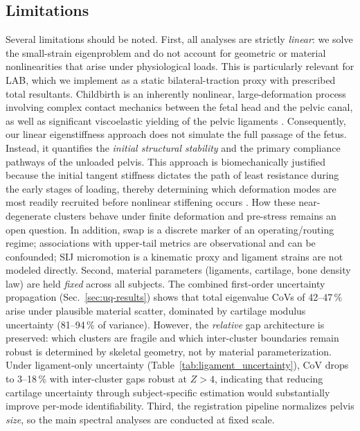 \documentclass[11pt]{article}
\begin{document}
\subsection*{Limitations}
Several limitations should be noted.
First, all analyses are strictly \emph{linear}: we solve the small-strain eigenproblem and do not account for geometric or material nonlinearities that arise under physiological loads.
This is particularly relevant for LAB, which we implement as a static bilateral-traction proxy with prescribed total resultants. 
Childbirth is an inherently nonlinear, large-deformation process involving complex contact mechanics between the fetal head and the pelvic canal, as well as significant viscoelastic yielding of the pelvic ligaments \citep{BiomechPregnancy2022,ChenGrimm2021,Almeida2024Uterus,Vleeming2012}. 
Consequently, our linear eigenstiffness approach does not simulate the full passage of the fetus. 
Instead, it quantifies the \emph{initial structural stability} and the primary compliance pathways of the unloaded pelvis. 
This approach is biomechanically justified because the initial tangent stiffness dictates the path of least resistance during the early stages of loading, thereby determining which deformation modes are most readily recruited before nonlinear stiffening occurs \citep{BonetWood1997}. 
How these near-degenerate clusters behave under finite deformation and pre-stress remains an open question.
In addition, swap is a discrete marker of an operating/routing regime; associations with upper-tail metrics are observational and can be confounded; SIJ micromotion is a kinematic proxy and ligament strains are not modeled directly.
Second, material parameters (ligaments, cartilage, bone density law) are held \emph{fixed} across all subjects.
The combined first-order uncertainty propagation (Sec.~\ref{sec:uq-results}) shows that total eigenvalue CoVs of 42--47\,\% arise under plausible material scatter, dominated by cartilage modulus uncertainty (81--94\,\% of variance).
However, the \emph{relative} gap architecture is preserved: which clusters are fragile and which inter-cluster boundaries remain robust is determined by skeletal geometry, not by material parameterization.
Under ligament-only uncertainty (Table~\ref{tab:ligament_uncertainty}), CoV drops to 3--18\,\% with inter-cluster gaps robust at $Z > 4$, indicating that reducing cartilage uncertainty through subject-specific estimation would substantially improve per-mode identifiability.
Third, the registration pipeline normalizes pelvis \emph{size}, so the main spectral analyses are conducted at fixed scale.
\end{document}
